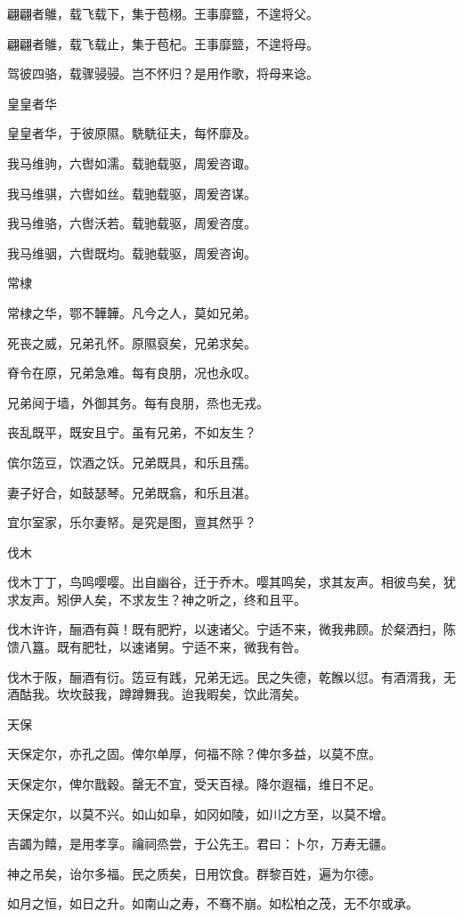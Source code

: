 翩翩者鵻，载飞载下，集于苞栩。王事靡盬，不遑将父。

翩翩者鵻，载飞载止，集于苞杞。王事靡盬，不遑将母。

驾彼四骆，载骤骎骎。岂不怀归？是用作歌，将母来谂。

皇皇者华

皇皇者华，于彼原隰。駪駪征夫，每怀靡及。

我马维驹，六辔如濡。载驰载驱，周爰咨诹。

我马维骐，六辔如丝。载驰载驱，周爰咨谋。

我马维骆，六辔沃若。载驰载驱，周爰咨度。

我马维骃，六辔既均。载驰载驱，周爰咨询。

常棣

常棣之华，鄂不韡韡。凡今之人，莫如兄弟。

死丧之威，兄弟孔怀。原隰裒矣，兄弟求矣。

脊令在原，兄弟急难。每有良朋，况也永叹。

兄弟阋于墙，外御其务。每有良朋，烝也无戎。

丧乱既平，既安且宁。虽有兄弟，不如友生？

傧尔笾豆，饮酒之饫。兄弟既具，和乐且孺。

妻子好合，如鼓瑟琴。兄弟既翕，和乐且湛。

宜尔室家，乐尔妻帑。是究是图，亶其然乎？

伐木

伐木丁丁，鸟鸣嘤嘤。出自幽谷，迁于乔木。嘤其鸣矣，求其友声。相彼鸟矣，犹求友声。矧伊人矣，不求友生？神之听之，终和且平。

伐木许许，酾酒有藇！既有肥羜，以速诸父。宁适不来，微我弗顾。於粲洒扫，陈馈八簋。既有肥牡，以速诸舅。宁适不来，微我有咎。

伐木于阪，酾酒有衍。笾豆有践，兄弟无远。民之失德，乾餱以愆。有酒湑我，无酒酤我。坎坎鼓我，蹲蹲舞我。迨我暇矣，饮此湑矣。

天保

天保定尔，亦孔之固。俾尔单厚，何福不除？俾尔多益，以莫不庶。

天保定尔，俾尔戬穀。罄无不宜，受天百禄。降尔遐福，维日不足。

天保定尔，以莫不兴。如山如阜，如冈如陵，如川之方至，以莫不增。

吉蠲为饎，是用孝享。禴祠烝尝，于公先王。君曰：卜尔，万寿无疆。

神之吊矣，诒尔多福。民之质矣，日用饮食。群黎百姓，遍为尔德。

如月之恒，如日之升。如南山之寿，不骞不崩。如松柏之茂，无不尔或承。

